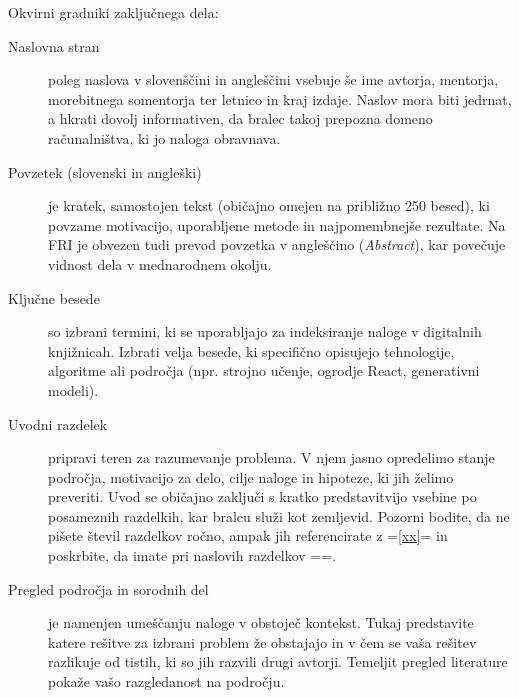 \documentclass[9pt]{style/friteza}
\begin{document}
Okvirni gradniki zaključnega dela:
\begin{description}
    \item[Naslovna stran] poleg naslova v slovenščini in angleščini vsebuje še ime avtorja, mentorja, morebitnega somentorja ter letnico in kraj izdaje. Naslov mora biti jedrnat, a hkrati dovolj informativen, da bralec takoj prepozna domeno računalništva, ki jo naloga obravnava.
    
    \item[Povzetek (slovenski in angleški)] je kratek, samostojen tekst (običajno omejen na približno 250 besed), ki povzame motivacijo, uporabljene metode in najpomembnejše rezultate. Na FRI je obvezen tudi prevod povzetka v angleščino (\textit{Abstract}), kar povečuje vidnost dela v mednarodnem okolju.
    
    \item[Ključne besede] so izbrani termini, ki se uporabljajo za indeksiranje naloge v digitalnih knjižnicah. Izbrati velja besede, ki specifično opisujejo tehnologije, algoritme ali področja (npr. strojno učenje, ogrodje React, generativni modeli).
    
    \item[Uvodni razdelek] pripravi teren za razumevanje problema. V njem jasno opredelimo stanje področja, motivacijo za delo, cilje naloge in hipoteze, ki jih želimo preveriti. Uvod se običajno zaključi s kratko predstavitvijo vsebine po posameznih razdelkih, kar bralcu služi kot zemljevid. Pozorni bodite, da ne pišete števil razdelkov ročno, ampak jih referencirate z \ltx=\ref{xx}= in poskrbite, da imate pri naslovih razdelkov \ltx=\label{xx}=.
    
    \item[Pregled področja in sorodnih del] je namenjen umeščanju naloge v obstoječ kontekst. Tukaj predstavite katere rešitve za izbrani problem že obstajajo in v čem se vaša rešitev razlikuje od tistih, ki so jih razvili drugi avtorji. Temeljit pregled literature pokaže vašo razgledanost na področju.
    

\end{description}
\end{document}
